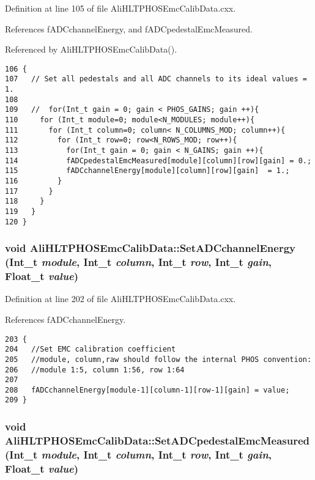 Definition at line 105 of file Ali\-HLTPHOSEmc\-Calib\-Data.cxx.

References f\-ADCchannel\-Energy, and f\-ADCpedestal\-Emc\-Measured.

Referenced by Ali\-HLTPHOSEmc\-Calib\-Data().

\footnotesize\begin{verbatim}106 {
107   // Set all pedestals and all ADC channels to its ideal values = 1.
108 
109   //  for(Int_t gain = 0; gain < PHOS_GAINS; gain ++){
110     for (Int_t module=0; module<N_MODULES; module++){
111       for (Int_t column=0; column< N_COLUMNS_MOD; column++){
112         for (Int_t row=0; row<N_ROWS_MOD; row++){
113           for(Int_t gain = 0; gain < N_GAINS; gain ++){
114           fADCpedestalEmcMeasured[module][column][row][gain] = 0.;
115           fADCchannelEnergy[module][column][row][gain]  = 1.;
116         }
117       }
118     }
119   }
120 }
\end{verbatim}\normalsize 


\subsubsection{\setlength{\rightskip}{0pt plus 5cm}void Ali\-HLTPHOSEmc\-Calib\-Data::Set\-ADCchannel\-Energy (Int\_\-t {\em module}, Int\_\-t {\em column}, Int\_\-t {\em row}, Int\_\-t {\em gain}, Float\_\-t {\em value})}\label{classAliHLTPHOSEmcCalibData_a9}




Definition at line 202 of file Ali\-HLTPHOSEmc\-Calib\-Data.cxx.

References f\-ADCchannel\-Energy.

\footnotesize\begin{verbatim}203 {
204   //Set EMC calibration coefficient
205   //module, column,raw should follow the internal PHOS convention:
206   //module 1:5, column 1:56, row 1:64
207 
208   fADCchannelEnergy[module-1][column-1][row-1][gain] = value;
209 }
\end{verbatim}\normalsize 


\subsubsection{\setlength{\rightskip}{0pt plus 5cm}void Ali\-HLTPHOSEmc\-Calib\-Data::Set\-ADCpedestal\-Emc\-Measured (Int\_\-t {\em module}, Int\_\-t {\em column}, Int\_\-t {\em row}, Int\_\-t {\em gain}, Float\_\-t {\em value})}\label{classAliHLTPHOSEmcCalibData_a10}




